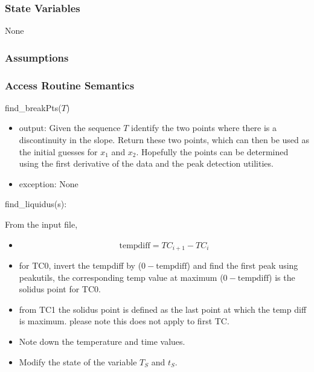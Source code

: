 \documentclass[12pt, titlepage]{article}
\begin{document}
\subsubsection{State Variables}

None

\subsubsection{Assumptions}

\subsubsection{Access Routine Semantics}

\noindent find\_breakPts($T$)

\begin{itemize}
\item output: Given the sequence $T$ identify the two points where there is a
  discontinuity in the slope.  Return these two points, which can then be used
  as the initial guesses for $x_1$ and $x_2$.  Hopefully the points can be
  determined using the first derivative of the data and the peak detection
  utilities.  
\item exception: None
\end{itemize}


\noindent find\_liquidus(s):

From the input file,         

\begin{itemize}

\item {}
\begin{equation*}
\text{tempdiff}  = TC_{i+1} - TC{_i} 
\end{equation*}

\item for TC0, invert the tempdiff by ({$0 - \text{tempdiff}$}) and find the
  first peak using peakutils, the corresponding temp value at maximum
  ({$0 - \text{tempdiff}$}) is the solidus point for TC0.

\item from TC1 the solidus point is defined as the last point at which the temp
  diff is maximum. please note this does not apply to first TC.
  
\item Note down the temperature and time values.  
\item Modify the state of the variable $T_S$ and $t_S$.\\

\end{itemize}
\end{document}
